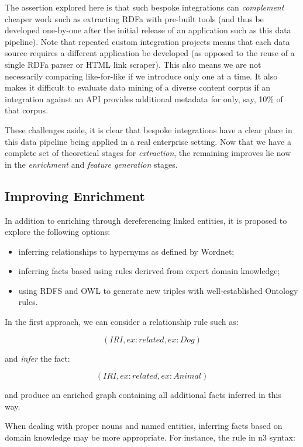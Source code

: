 \documentclass[10pt,a4paper]{report}
\begin{document}
The assertion explored here is that such bespoke integrations can
\emph{complement} cheaper work such as extracting RDFa with pre-built tools
(and thus be developed one-by-one after the initial release of an application
such as this data pipeline). Note that repeated custom integration projects
means that each data source requires a different application be developed (as
opposed to the reuse of a single RDFa parser or HTML link scraper). This
also means we are not necessarily comparing like-for-like if we introduce only
one at a time. It also makes it
difficult to evaluate data mining of a diverse content corpus if an integration
against an API provides additional metadata for only, say, 10\% of that corpus.

These challenges aside, it is clear that bespoke integrations have a clear place
in this data pipeline being applied in a real enterprise setting. Now that
we have a complete set of theoretical stages for \emph{extraction}, the
remaining improves lie now in the \emph{enrichment} and
\emph{feature generation} stages.

\subsection{Improving Enrichment}

In addition to enriching through dereferencing linked entities, it is proposed
to explore the following options:

\begin{itemize}
\item inferring relationships to hypernyms as defined by Wordnet\cite{miller1995wordnet};
\item inferring facts based using rules derirved from expert domain knowledge;
\item using RDFS and OWL to generate new triples with well-established Ontology rules.
\end{itemize}

In the first approach, we can consider a relationship rule such as:

$$
(IRI, ex:related, ex:Dog)
$$

\noindent and \emph{infer} the fact:

$$
(IRI, ex:related, ex:Animal)
$$

\noindent and produce an enriched graph containing all additional facts
inferred in this way.

When dealing with proper nouns and named entities, inferring facts based on
domain knowledge may be more appropriate. For instance, the rule in n3 syntax:
\end{document}
